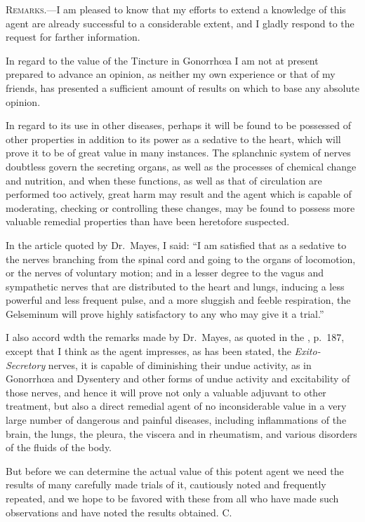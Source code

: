 
\textsc{Remarks.}---I am pleased to know that my efforts to extend a knowledge
of this agent are already successful to a considerable extent, and I
gladly respond to the request for farther information.

In regard to the value of the Tincture in Gonorrhœa I am not at
present prepared to advance an opinion, as neither my own experience
or that of my friends, has presented a sufficient amount of results on
which to base any absolute opinion.

In regard to its use in other diseases, perhaps it will be found to be
possessed of other properties in addition to its power as a sedative to
the heart, which will prove it to be of great value in many instances.
The splanchnic system of nerves doubtless govern the secreting organs,
as well as the processes of chemical change and nutrition, and when
these functions, as well as that of circulation are performed too actively,
great harm may result and the agent which is capable of
moderating, checking or controlling these changes, may be found to
possess more valuable remedial properties than have been heretofore
suspected.

In the article quoted by Dr.~Mayes, I said: ``I am satisfied that as
a sedative to the nerves branching from the spinal cord and going to
the organs of locomotion, or the nerves of voluntary motion; and in a
lesser degree to the vagus and sympathetic nerves that are distributed
to the heart and lungs, inducing a less powerful and less frequent pulse,
and a more sluggish and feeble respiration, the Gelseminum will prove
highly satisfactory to any who may give it a trial.''

I also accord wdth the remarks made by Dr.~Mayes, as quoted in the
, p.~187, except that I think as the agent impresses, as has
been stated, the \emph{Exito-Secretory} nerves, it is capable of diminishing their
undue activity, as in Gonorrhœa and Dysentery and other forms of undue
activity and excitability of those nerves, and hence it will prove
not only a valuable adjuvant to other treatment, but also a direct remedial
agent of no inconsiderable value in a very large number of dangerous
and painful diseases, including inflammations of the brain, the
lungs, the pleura, the viscera and in rheumatism, and various disorders
of the fluids of the body.

But before we can determine the actual value of this potent agent
we need the results of many carefully made trials of it, cautiously noted
and frequently repeated, and we hope to be favored with these from
all who have made such observations and have noted the results obtained.
\hfill{}C.\quad\endinput
